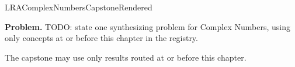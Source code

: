 \ifcsname LRAComplexNumbersCapstoneRendered\endcsname
\else
\expandafter\gdef\csname LRAComplexNumbersCapstoneRendered\endcsname{}

\newpage
{}
\label{cap:complex-numbers}

\begin{tcolorbox}[
  colback=gray!6,
  colframe=gray!40,
  arc=2pt,
  left=8pt, right=8pt, top=6pt, bottom=6pt,
  title={\small\textbf{Capstone Problem}},
  fonttitle=\small\bfseries
]
\textbf{Problem.}
TODO: state one synthesizing problem for Complex Numbers, using only concepts at or
before this chapter in the registry.
\end{tcolorbox}

\begin{remark*}
The capstone may use only results routed at or before this chapter.
\end{remark*}

\clearpage
\fi
